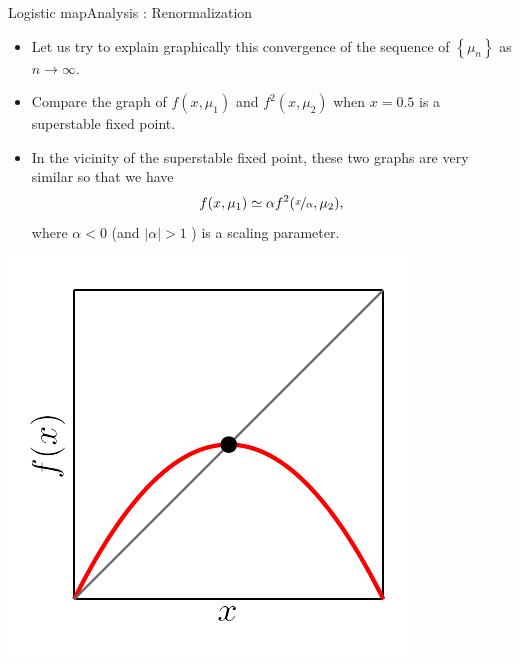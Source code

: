 \documentclass[usenames,dvipsnames,svgnames,10pt,aspectratio=169]{beamer}
\begin{document}
\begin{frame}[t, c]{Logistic map}{Analysis : Renormalization}
	\begin{minipage}{.68\textwidth}
		\begin{itemize}
			\item Let us try to explain graphically this convergence of the sequence of \( \left\{ \mu_n \right\} \) as \( n \to \infty \).

			\medskip

			\item Compare the graph of \(f(x, \mu_1)\) and \(f^2(x, \mu_2)\) when \(x = 0.5\) is a superstable fixed point.

			\medskip

			\item In the vicinity of the superstable fixed point, these two graphs are very similar so that we have
			\[
				f(x, \mu_1) \simeq \alpha f^2(\nicefrac{x}{\alpha}, \mu_2),
			\]
			where \( \alpha < 0 \) (and \( \vert \alpha \vert > 1\) ) is a scaling parameter.
		\end{itemize}
	\end{minipage}%
	\hfill
	\begin{minipage}{.28\textwidth}
		\centering
		\includegraphics[width=\textwidth]{renormalization_1}
	\end{minipage}

	\vspace{1cm}
\end{frame}
\end{document}
